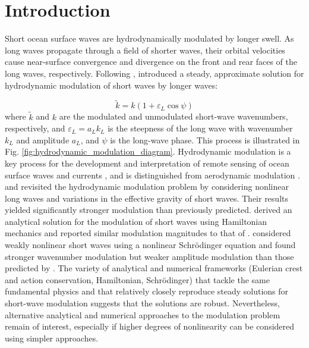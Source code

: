 \documentclass[lineno]{jfm}
\begin{document}
\section{Introduction}

Short ocean surface waves are hydrodynamically modulated by longer swell.
As long waves propagate through a field of shorter waves, their orbital
velocities cause near-surface convergence and divergence on the front and rear
faces of the long waves, respectively.
Following \citet{unna1941white,unna1942waves,unna1947sea},
\citet{longuet1960changes} introduced a steady, approximate solution for
hydrodynamic modulation of short waves by longer waves:

\begin{equation}
\label{eq:lhs1960wavenumber}
\widetilde{k} = k (1 + \varepsilon_L \cos{\psi})
\end{equation}
where $\widetilde{k}$ and $k$ are the modulated and unmodulated short-wave wavenumbers,
respectively, and $\varepsilon_L = a_L k_L$ is the steepness of the long wave with
wavenumber $k_L$ and amplitude $a_L$, and $\psi$ is the long-wave phase.
This process is illustrated in Fig. \ref{fig:hydrodynamic_modulation_diagram}.
Hydrodynamic modulation is a key process for the development and
interpretation of remote sensing of ocean surface waves and currents
\citep{keller1975microwave,hara1994hydrodynamic}, and is distinguished
from aerodynamic modulation \citep{donelan1987effect,belcher1999wave,chen2000effects}.
\citet{phillips1981dispersion} and \citet{longuet1987propagation} revisited the
hydrodynamic modulation problem by considering nonlinear long waves and
variations in the effective gravity of short waves.
Their results yielded significantly stronger modulation than previously predicted.
\citet{henyey1988energy} derived an analytical solution for the modulation of
short waves using Hamiltonian mechanics and reported similar modulation magnitudes
to that of \citet{longuet1987propagation}.
\citet{zhang1990evolution} considered weakly nonlinear short waves
using a nonlinear Schr\" odinger equation and found stronger wavenumber
modulation but weaker amplitude modulation than those predicted by
\citet{longuet1987propagation}.
The variety of analytical and numerical frameworks (Eulerian crest and action
conservation, Hamiltonian, Schr\" odinger) that tackle the same fundamental
physics and that relatively closely reproduce steady solutions for short-wave
modulation suggests that the solutions are robust.
Nevertheless, alternative analytical and numerical approaches to the modulation
problem remain of interest, especially if higher degrees of nonlinearity can be
considered using simpler approaches.
\end{document}
